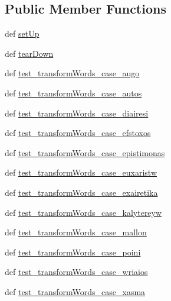 \subsection*{Public Member Functions}
\begin{DoxyCompactItemize}
\item 
def \hyperlink{classgreek__support__unit__tests_1_1TestAudioProcessing_a235dfd8fbbba93a77b341ebf8d7fb44f}{set\-Up}
\item 
def \hyperlink{classgreek__support__unit__tests_1_1TestAudioProcessing_a412e0172ba6255e53dd93b8499e0ae6f}{tear\-Down}
\item 
def \hyperlink{classgreek__support__unit__tests_1_1TestAudioProcessing_accc68064811fbf07a0602bfe4cbef643}{test\-\_\-transform\-Words\-\_\-case\-\_\-augo}
\item 
def \hyperlink{classgreek__support__unit__tests_1_1TestAudioProcessing_a3fcb700842d6d592f3b8b17fbff14eb7}{test\-\_\-transform\-Words\-\_\-case\-\_\-autos}
\item 
def \hyperlink{classgreek__support__unit__tests_1_1TestAudioProcessing_ab2c5d249fc9c76099d912aa38473da6d}{test\-\_\-transform\-Words\-\_\-case\-\_\-diairesi}
\item 
def \hyperlink{classgreek__support__unit__tests_1_1TestAudioProcessing_a33b4e7e80a4d51dd1a110a9168f0134c}{test\-\_\-transform\-Words\-\_\-case\-\_\-efstoxos}
\item 
def \hyperlink{classgreek__support__unit__tests_1_1TestAudioProcessing_a73f0bbc7b7398f3bfde28db3a8b1085f}{test\-\_\-transform\-Words\-\_\-case\-\_\-epistimonas}
\item 
def \hyperlink{classgreek__support__unit__tests_1_1TestAudioProcessing_a5e9e5337ec1de418f16ba04acb7d1195}{test\-\_\-transform\-Words\-\_\-case\-\_\-euxaristw}
\item 
def \hyperlink{classgreek__support__unit__tests_1_1TestAudioProcessing_a3b50e7709fbb7b7da7ab8480cca54f90}{test\-\_\-transform\-Words\-\_\-case\-\_\-exairetika}
\item 
def \hyperlink{classgreek__support__unit__tests_1_1TestAudioProcessing_a56bb0a110961ac313238583ac0a9456b}{test\-\_\-transform\-Words\-\_\-case\-\_\-kalytereyw}
\item 
def \hyperlink{classgreek__support__unit__tests_1_1TestAudioProcessing_a0edd822483fc91718e6dec07c86f6df8}{test\-\_\-transform\-Words\-\_\-case\-\_\-mallon}
\item 
def \hyperlink{classgreek__support__unit__tests_1_1TestAudioProcessing_a32eee319e08aab6a4414c688536494c7}{test\-\_\-transform\-Words\-\_\-case\-\_\-poini}
\item 
def \hyperlink{classgreek__support__unit__tests_1_1TestAudioProcessing_a781e2f5b661dc058cdc9c6ad129d0332}{test\-\_\-transform\-Words\-\_\-case\-\_\-wriaios}
\item 
def \hyperlink{classgreek__support__unit__tests_1_1TestAudioProcessing_a994d5c8dcfd668c5577a396454af1529}{test\-\_\-transform\-Words\-\_\-case\-\_\-xasma}
\end{DoxyCompactItemize}
